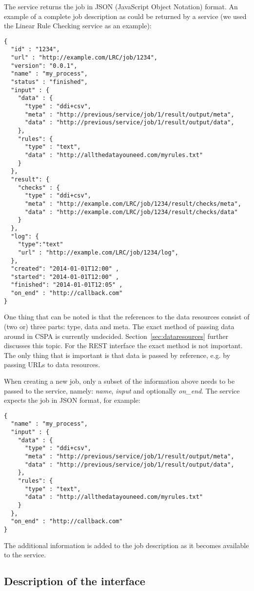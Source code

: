 \documentclass[a4paper]{article}
\begin{document}
The service returns the job in JSON (JavaScript Object Notation) format. An
example of a complete job description as could be returned by a service (we used
the Linear Rule Checking service as an example):
{\small
\begin{Verbatim}
{
  "id" : "1234",
  "url" : "http://example.com/LRC/job/1234",
  "version": "0.0.1",
  "name" : "my_process",
  "status" : "finished",
  "input" : {
    "data" : {
      "type" : "ddi+csv",
      "meta" : "http://previous/service/job/1/result/output/meta",
      "data" : "http://previous/service/job/1/result/output/data",
    },
    "rules": {
      "type" : "text",
      "data" : "http://allthedatayouneed.com/myrules.txt"
    }
  }, 
  "result": {
    "checks" : {
      "type" : "ddi+csv",
      "meta" : "http://example.com/LRC/job/1234/result/checks/meta",
      "data" : "http://example.com/LRC/job/1234/result/checks/data"
    }
  }, 
  "log": {
    "type":"text"
    "url" : "http://example.com/LRC/job/1234/log",
  },
  "created": "2014-01-01T12:00" ,
  "started": "2014-01-01T12:00" ,
  "finished": "2014-01-01T12:05" ,
  "on_end" : "http://callback.com"
}
\end{Verbatim}
}
One thing that can be noted is that the references to the data resources consist
of (two or) three parts: type, data and meta. The exact method of passing data
around in CSPA is currently undecided. Section~\ref{sec:dataresources} further
discusses this topic. For the REST interface the exact method is not important.
The only thing that is important is that data is passed by reference, e.g. by
passing URLs to data resources. 

When creating a new job, only a subset of the information above needs to be
passed to the service, namely: \emph{name}, \emph{input} and optionally
\emph{on\_end}. The service expects the job in JSON format, for example:
{\small
\begin{Verbatim}
{
  "name" : "my_process",
  "input" : {
    "data" : {
      "type" : "ddi+csv",
      "meta" : "http://previous/service/job/1/result/output/meta",
      "data" : "http://previous/service/job/1/result/output/data",
    },
    "rules": {
      "type" : "text",
      "data" : "http://allthedatayouneed.com/myrules.txt"
    }
  }, 
  "on_end" : "http://callback.com"
}
\end{Verbatim}
}

The additional information is added to the job description as it becomes
available to the service. 

\subsection{Description of the interface}
\end{document}
